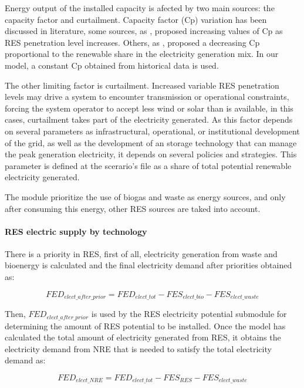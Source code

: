 Energy output of the installed capacity is afected by two main sources: the capacity factor and curtailment. Capacity factor (Cp) variation has been discussed in literature, some sources, as \cite{IEA2022}, proposed increasing values of Cp as RES penetration level increases. Others, as \cite{NREL2012}, proposed a decreasing Cp proportional to the renewable share in the electricity generation mix. In our model, a constant Cp obtained from historical data is used. 

The other limiting factor is curtailment. Increased variable RES penetration levels may drive a system to encounter transmission or operational constraints, forcing the system operator to accept less wind or solar than is available, in this cases, curtailment takes part of the electricity generated. As this factor depends on several parameters \cite{Bird2016} as  infrastructural, operational, or institutional development of the grid, as well as the development of an storage technology that can manage the peak generation electricity, it depends on several policies and strategies. This parameter is defined at the scerario's file as a share of total potential renewable electricity generated. 
 
The module prioritize the use of biogas and waste as energy sources, and only after consuming this energy, other RES sources are taked into account.



\paragraph{RES electric supply by technology}

There is a priority in RES, first of all, electricity generation from waste and bioenergy is calculated and the final electricity demand after priorities obtained as:

\begin{equation}
    FED_{elect\_after\_prior}= FED_{elect\_tot}-FES_{elect\_bio}-FES_{elect\_waste}
    \label{eq:FED-after-priorities}
\end{equation}

Then, $FED_{elect\_after\_prior}$ is used by the RES electricity potential submodule for determining the amount of RES potential to be installed.
Once the model has calculated the total amount of electricity generated from RES, it obtains the electricity demand from NRE that is needed to satisfy the total electricity demand as:

\begin{equation}
    FED_{elect\_NRE}= FED_{elect\_tot}-FES_{RES}-FES_{elect\_waste}
    \label{eq:FED-elect-NRE}
\end{equation}


